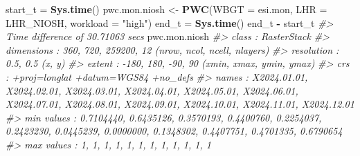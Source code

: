 \documentclass[
]{article}
\newenvironment{Shaded}{\begin{snugshade}}{\end{snugshade}}
\newcommand{\AttributeTok}[1]{\textcolor[rgb]{0.13,0.29,0.53}{#1}}
\newcommand{\CommentTok}[1]{\textcolor[rgb]{0.56,0.35,0.01}{\textit{#1}}}
\newcommand{\FunctionTok}[1]{\textcolor[rgb]{0.13,0.29,0.53}{\textbf{#1}}}
\newcommand{\NormalTok}[1]{#1}
\newcommand{\OtherTok}[1]{\textcolor[rgb]{0.56,0.35,0.01}{#1}}
\newcommand{\SpecialCharTok}[1]{\textcolor[rgb]{0.81,0.36,0.00}{\textbf{#1}}}
\newcommand{\StringTok}[1]{\textcolor[rgb]{0.31,0.60,0.02}{#1}}
\begin{document}
\begin{Shaded}
\begin{Highlighting}[]
\NormalTok{start\_t }\OtherTok{=} \FunctionTok{Sys.time}\NormalTok{()}
\NormalTok{pwc.mon.niosh }\OtherTok{\textless{}{-}} \FunctionTok{PWC}\NormalTok{(}\AttributeTok{WBGT =}\NormalTok{ esi.mon,  }\AttributeTok{LHR =}\NormalTok{ LHR\_NIOSH, }\AttributeTok{workload =} \StringTok{"high"}\NormalTok{)}
\NormalTok{end\_t }\OtherTok{=} \FunctionTok{Sys.time}\NormalTok{()}
\NormalTok{end\_t }\SpecialCharTok{{-}}\NormalTok{ start\_t}
\CommentTok{\#\textgreater{} Time difference of 30.71063 secs}
\NormalTok{pwc.mon.niosh}
\CommentTok{\#\textgreater{} class      : RasterStack }
\CommentTok{\#\textgreater{} dimensions : 360, 720, 259200, 12  (nrow, ncol, ncell, nlayers)}
\CommentTok{\#\textgreater{} resolution : 0.5, 0.5  (x, y)}
\CommentTok{\#\textgreater{} extent     : {-}180, 180, {-}90, 90  (xmin, xmax, ymin, ymax)}
\CommentTok{\#\textgreater{} crs        : +proj=longlat +datum=WGS84 +no\_defs }
\CommentTok{\#\textgreater{} names      : X2024.01.01, X2024.02.01, X2024.03.01, X2024.04.01, X2024.05.01, X2024.06.01, X2024.07.01, X2024.08.01, X2024.09.01, X2024.10.01, X2024.11.01, X2024.12.01 }
\CommentTok{\#\textgreater{} min values :   0.7104440,   0.6435126,   0.3570193,   0.4400760,   0.2254037,   0.2423230,   0.0445239,   0.0000000,   0.1348302,   0.4407751,   0.4701335,   0.6790654 }
\CommentTok{\#\textgreater{} max values :           1,           1,           1,           1,           1,           1,           1,           1,           1,           1,           1,           1}
\end{Highlighting}
\end{Shaded}
\end{document}
